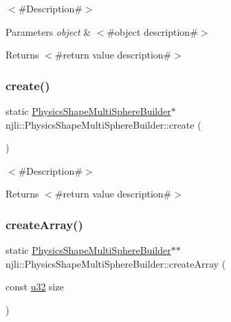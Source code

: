 $<$\#\+Description\#$>$


\begin{DoxyParams}{Parameters}
{\em object} & $<$\#object description\#$>$\\
\hline
\end{DoxyParams}
\begin{DoxyReturn}{Returns}
$<$\#return value description\#$>$ 
\end{DoxyReturn}
\mbox{\label{classnjli_1_1_physics_shape_multi_sphere_builder_ac2eab3049d19f25208af91e822eb477a}} 
\subsubsection{\texorpdfstring{create()}{create()}}
{\footnotesize\ttfamily static \mbox{\hyperlink{classnjli_1_1_physics_shape_multi_sphere_builder}{Physics\+Shape\+Multi\+Sphere\+Builder}}$\ast$ njli\+::\+Physics\+Shape\+Multi\+Sphere\+Builder\+::create (\begin{DoxyParamCaption}{ }\end{DoxyParamCaption})\hspace{0.3cm}{\ttfamily [static]}}

$<$\#\+Description\#$>$

\begin{DoxyReturn}{Returns}
$<$\#return value description\#$>$ 
\end{DoxyReturn}
\mbox{\label{classnjli_1_1_physics_shape_multi_sphere_builder_a1bd6afbd215f295368f84c18eef4648a}} 
\subsubsection{\texorpdfstring{create\+Array()}{createArray()}}
{\footnotesize\ttfamily static \mbox{\hyperlink{classnjli_1_1_physics_shape_multi_sphere_builder}{Physics\+Shape\+Multi\+Sphere\+Builder}}$\ast$$\ast$ njli\+::\+Physics\+Shape\+Multi\+Sphere\+Builder\+::create\+Array (\begin{DoxyParamCaption}\item[{const \mbox{\hyperlink{_util_8h_a10e94b422ef0c20dcdec20d31a1f5049}{u32}}}]{size }\end{DoxyParamCaption})\hspace{0.3cm}{\ttfamily [static]}}

